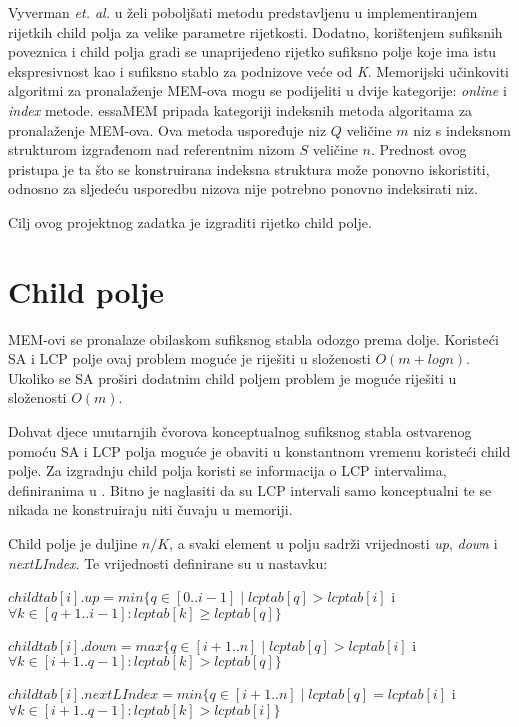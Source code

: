 \documentclass[times, utf8, seminar, numeric]{fer}
\begin{document}
Vyverman \textit{et. al.} u \cite{essa} želi poboljšati metodu predstavljenu u \cite{ssa} implementiranjem rijetkih child polja za velike parametre rijetkosti. Dodatno, korištenjem sufiksnih poveznica  i child polja gradi se unaprijeđeno rijetko sufiksno polje  koje ima istu ekspresivnost kao i sufiksno stablo za podnizove veće od \textit{K}. Memorijski učinkoviti algoritmi za pronalaženje MEM-ova mogu se podijeliti u dvije kategorije: \textit{online} i \textit{index} metode. essaMEM pripada kategoriji indeksnih metoda algoritama za pronalaženje MEM-ova. Ova metoda uspoređuje niz $Q$ veličine $m$ niz s indeksnom strukturom izgrađenom nad referentnim nizom $S$ veličine $n$. Prednost ovog pristupa je ta što se konstruirana indeksna struktura može ponovno iskoristiti, odnosno za sljedeću usporedbu nizova nije potrebno ponovno indeksirati niz. 

Cilj ovog projektnog zadatka je izgraditi rijetko child polje.

\chapter{Child polje}
MEM-ovi se pronalaze obilaskom sufiksnog stabla odozgo prema dolje. Koristeći SA i LCP polje ovaj problem moguće je riješiti u složenosti $O(m + log n)$. Ukoliko se SA proširi dodatnim child poljem problem je moguće riješiti u složenosti $O(m)$.

Dohvat djece unutarnjih čvorova konceptualnog sufiksnog stabla ostvarenog pomoću SA i LCP polja moguće je obaviti u konstantnom vremenu koristeći child polje. Za izgradnju child polja koristi se informacija o LCP intervalima, definiranima u \citep{esa}. Bitno je naglasiti da su LCP intervali samo konceptualni te se nikada ne konstruiraju niti čuvaju u memoriji.

Child polje je duljine $n / K$, a svaki element u polju sadrži vrijednosti \textit{up}, \textit{down} i \textit{nextLIndex}. Te vrijednosti definirane su u nastavku:

$childtab[i].up = min\{q \in [0..i-1] \mid lcptab[q] > lcptab[i]$ i $\forall k \in [q+1..i-1] : lcptab[k] \geq lcptab[q]\}$

$childtab[i].down = max\{q \in [i+1..n] \mid lcptab[q] > lcptab[i]$ i $\forall k \in [i+1..q-1] : lcptab[k] > lcptab[q]\}$

$childtab[i].nextLIndex = min\{q \in [i+1..n] \mid lcptab[q] = lcptab[i]$ i $\forall k \in [i+1..q-1] : lcptab[k] > lcptab[i]\}$
\end{document}
